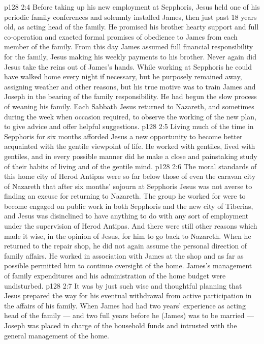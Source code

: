 \vs p128 2:4 \pc Before taking up his new employment at Sepphoris, Jesus held one of his periodic family conferences and solemnly installed James, then just past 18 years old, as acting head of the family. He promised his brother hearty support and full co\hyp{}operation and exacted formal promises of obedience to James from each member of the family. From this day James assumed full financial responsibility for the family, Jesus making his weekly payments to his brother. Never again did Jesus take the reins out of James’s hands. While working at Sepphoris he could have walked home every night if necessary, but he purposely remained away, assigning weather and other reasons, but his true motive was to train James and Joseph in the bearing of the family responsibility. He had begun the slow process of weaning his family. Each Sabbath Jesus returned to Nazareth, and sometimes during the week when occasion required, to observe the working of the new plan, to give advice and offer helpful suggestions.
\vs p128 2:5 \pc Living much of the time in Sepphoris for six months afforded Jesus a new opportunity to become better acquainted with the gentile viewpoint of life. He worked with gentiles, lived with gentiles, and in every possible manner did he make a close and painstaking study of their habits of living and of the gentile mind.
\vs p128 2:6 The moral standards of this home city of Herod Antipas were so far below those of even the caravan city of Nazareth that after six months’ sojourn at Sepphoris Jesus was not averse to finding an excuse for returning to Nazareth. The group he worked for were to become engaged on public work in both Sepphoris and the new city of Tiberias, and Jesus was disinclined to have anything to do with any sort of employment under the supervision of Herod Antipas. And there were still other reasons which made it wise, in the opinion of Jesus, for him to go back to Nazareth. When he returned to the repair shop, he did not again assume the personal direction of family affairs. He worked in association with James at the shop and as far as possible permitted him to continue oversight of the home. James’s management of family expenditures and his administration of the home budget were undisturbed.
\vs p128 2:7 It was by just such wise and thoughtful planning that Jesus prepared the way for his eventual withdrawal from active participation in the affairs of his family. When James had had two years’ experience as acting head of the family --- and two full years before he (James) was to be married --- Joseph was placed in charge of the household funds and intrusted with the general management of the home.
